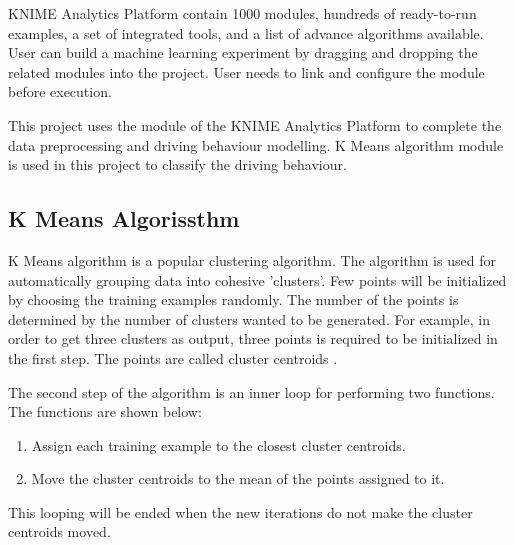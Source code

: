 KNIME Analytics Platform contain 1000 modules, hundreds of ready-to-run examples, a set of integrated tools, and a list of advance algorithms available. User can build a machine learning experiment by dragging and dropping the related modules into the project. User needs to link and configure the module before execution.

This project uses the module of the KNIME Analytics Platform to complete the data preprocessing and driving behaviour modelling. K Means algorithm module is used in this project to classify the driving behaviour.\cite{knime}

\subsection{K Means Algorissthm}
K Means algorithm is a popular clustering algorithm. The algorithm is used for automatically grouping data into cohesive 'clusters'. Few points will be initialized by choosing the training examples randomly. The number of the points is determined by the number of clusters wanted to be generated. For example, in order to get three clusters as output, three points is required to be initialized in the first step. The points are called cluster centroids \cite{andrew:2016}.

The second step of the algorithm is an inner loop for performing two functions. The functions are shown below:
\begin{enumerate}
\item Assign each training example to the closest cluster centroids.
\item Move the cluster centroids to the mean of the points assigned to it.
\end{enumerate} 

This looping will be ended when the new iterations do not make the cluster centroids moved.

